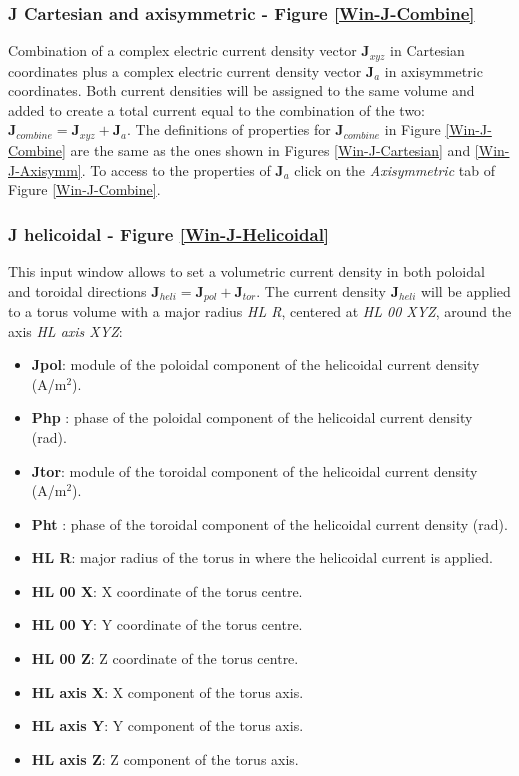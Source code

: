 \subsubsection{J Cartesian and axisymmetric - Figure \ref{Win-J-Combine}}

Combination of a complex electric current density vector $\textbf{J}_{xyz}$ in Cartesian coordinates plus a complex electric current density vector $\textbf{J}_{a}$ in axisymmetric coordinates. Both current densities will be assigned to the same volume and added to create a total current equal to the combination of the two: $\textbf{J}_{combine} = \textbf{J}_{xyz} + \textbf{J}_{a}$. The definitions of properties for $\textbf{J}_{combine}$ in Figure \ref{Win-J-Combine} are the same as the ones shown in Figures \ref{Win-J-Cartesian} and \ref{Win-J-Axisymm}. To access to the properties of $\textbf{J}_{a}$ click on the \textit{Axisymmetric} tab of Figure \ref{Win-J-Combine}.

\subsubsection{J helicoidal - Figure \ref{Win-J-Helicoidal}}

This input window allows to set a volumetric current density in both poloidal and toroidal directions $\textbf{J}_{heli} = \textbf{J}_{pol} + \textbf{J}_{tor}$. The current density $\textbf{J}_{heli}$ will be applied to a torus volume with a major radius \emph{HL R}, centered at \emph{HL 00 XYZ}, around the axis \emph{HL axis XYZ}:
\begin{itemize}\itemsep0em 
	\item \textbf{Jpol}: module of the poloidal component of the helicoidal current density (A/m$^{2}$). 
	\item \textbf{Php }: phase of the poloidal component of the helicoidal current density (rad).
	\\
	\item \textbf{Jtor}: module of the toroidal component of the helicoidal current density (A/m$^{2}$). 
    \item \textbf{Pht }: phase of the toroidal component of the helicoidal current density (rad).
    \\
    \item \textbf{HL R}: major radius of the torus in where the helicoidal current is applied.
    \\
	\item \textbf{HL 00 X}: X coordinate of the torus centre.
	\item \textbf{HL 00 Y}: Y coordinate of the torus centre.
	\item \textbf{HL 00 Z}: Z coordinate of the torus centre.
	\\
	\item \textbf{HL axis X}: X component of the torus axis.
	\item \textbf{HL axis Y}: Y component of the torus axis.
	\item \textbf{HL axis Z}: Z component of the torus axis.
\end{itemize}

